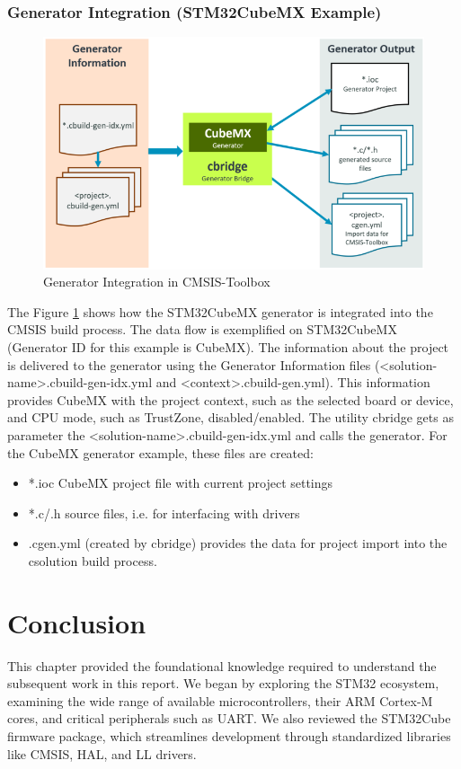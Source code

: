 \subsubsection{Generator Integration (STM32CubeMX Example)}
\begin{figure}[H]
	\centering
	\includegraphics[width=15cm]{img/Generator-Integration.png}
	\caption{Generator Integration in CMSIS-Toolbox}
	\label{fig:generator}
\end{figure}
The Figure \ref{fig:generator} shows how the STM32CubeMX generator is integrated into the CMSIS build process. The data flow is exemplified on STM32CubeMX (Generator ID for this example is CubeMX). The information about the project is delivered to the generator using the Generator Information files (<solution-name>.cbuild-gen-idx.yml and <context>.cbuild-gen.yml). This information provides CubeMX with the project context, such as the selected board or device, and CPU mode, such as TrustZone, disabled/enabled.
The utility cbridge gets as parameter the <solution-name>.cbuild-gen-idx.yml and calls the generator. For the CubeMX generator example, these files are created:
\begin{itemize}
	\item *.ioc CubeMX project file with current project settings
	\item *.c/.h source files, i.e. for interfacing with drivers
	\item <project-name>.cgen.yml (created by cbridge) provides the data for project import into the csolution build process.
\end{itemize}
\newpage
\section*{Conclusion}
This chapter provided the foundational knowledge required to understand the subsequent work in this report. We began by exploring the STM32 ecosystem, examining the wide range of available microcontrollers, their ARM Cortex-M cores, and critical peripherals such as UART. We also reviewed the STM32Cube firmware package, which streamlines development through standardized libraries like CMSIS, HAL, and LL drivers.

